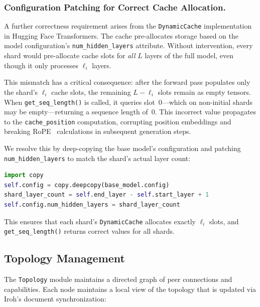 \documentclass[runningheads]{llncs}
\begin{document}
\subsubsection{Configuration Patching for Correct Cache Allocation.}
\label{sec:config_patch}

A further correctness requirement arises from the \texttt{DynamicCache} implementation in Hugging Face Transformers. The cache pre-allocates storage based on the model configuration's \texttt{num\_hidden\_layers} attribute. Without intervention, every shard would pre-allocate cache slots for \emph{all} $L$ layers of the full model, even though it only processes $\ell_i$ layers.

This mismatch has a critical consequence: after the forward pass populates only the shard's $\ell_i$ cache slots, the remaining $L - \ell_i$ slots remain as empty tensors. When \texttt{get\_seq\_length()} is called, it queries slot~0---which on non-initial shards may be empty---returning a sequence length of~0. This incorrect value propagates to the \texttt{cache\_position} computation, corrupting position embeddings and breaking RoPE~\cite{su2024roformer} calculations in subsequent generation steps.

We resolve this by deep-copying the base model's configuration and patching \texttt{num\_hidden\_layers} to match the shard's actual layer count:

\begin{lstlisting}[language=Python, caption={Configuration patching for correct DynamicCache allocation.}, label={lst:config_patch}]
import copy
self.config = copy.deepcopy(base_model.config)
shard_layer_count = self.end_layer - self.start_layer + 1
self.config.num_hidden_layers = shard_layer_count
\end{lstlisting}

This ensures that each shard's \texttt{DynamicCache} allocates exactly $\ell_i$ slots, and \texttt{get\_seq\_length()} returns correct values for all shards.

\subsection{Topology Management}
\label{sec:topology}

The \texttt{Topology} module maintains a directed graph of peer connections and capabilities. Each node maintains a local view of the topology that is updated via Iroh's document synchronization:
\end{document}

